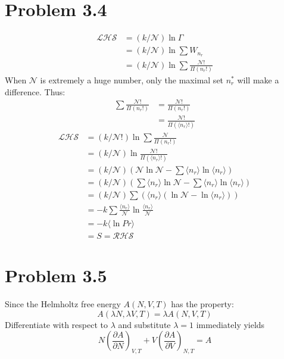 \documentclass{article}
\begin{document}
\section*{Problem 3.4}
    \begin{align}
    \mathcal{LHS}&=(k/\mathcal{N}) \ln\Gamma\\
    &=(k/\mathcal{N}) \ln\sum W_{n_r}\\
    &=(k/\mathcal{N}) \ln\sum \frac{\mathcal{N}!}{\Pi (n_r!)}
    \end{align}
When $\mathcal{N}$ is extremely a huge number, only the maximal set ${n_r^*}$ will make a difference. Thus:
    \begin{align}
    \sum \frac{\mathcal{N}!}{\Pi (n_r!)}&=\frac{\mathcal{N}!}{\Pi (n_r!)}\\
    &=\frac{\mathcal{N}!}{\Pi (\langle n_r \rangle !)}
    \end{align}
    \begin{align}
    \mathcal{LHS}&=(k/\mathcal{N}!) \ln\sum \frac{\mathcal{N}}{\Pi (n_r!)}\\
    &=(k/\mathcal{N}) \ln\frac{\mathcal{N}!}{\Pi (\langle n_r \rangle !)}\\
    &=(k/\mathcal{N}) \left( \mathcal{N}\ln\mathcal{N} - \sum \langle n_r \rangle \ln \langle n_r \rangle \right)\\
    &=(k/\mathcal{N}) \left( \sum \langle n_r \rangle \ln\mathcal{N} - \sum \langle n_r \rangle \ln \langle n_r \rangle \right)\\
    &=(k/\mathcal{N}) \sum \left( \langle n_r \rangle \left(\ln\mathcal{N} -\ln \langle n_r \rangle \right) \right)\\
    &=-k\sum \frac{\langle n_r \rangle}{\mathcal{N}} \ln \frac{\langle n_r \rangle}{\mathcal{N}}\\
    &=-k\langle \ln Pr \rangle\\
    &=S=\mathcal{RHS}
    \end{align}



\section*{Problem 3.5}
	Since the Helmholtz free energy $A(N,V,T)$ has the property:
	\begin{equation*}
		A(\lambda N,\lambda V,T) = \lambda A(N,V,T)
	\end{equation*}
	Differentiate with respect to $\lambda$ and substitute $\lambda=1$ immediately yields
	\begin{equation*}
		N\left( \frac{ \partial A }{\partial N} \right)_{V,T}+V \left( \frac{ \partial A }{\partial V} \right)_{N,T} = A
	\end{equation*}
\end{document}
